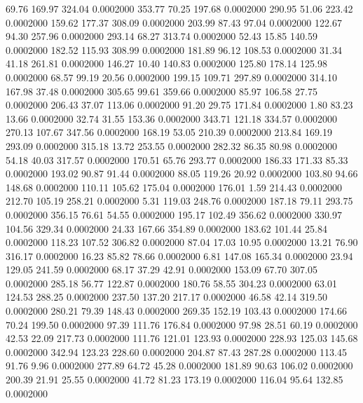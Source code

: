  69.76  169.97  324.04   0.0002000
 353.77   70.25  197.68   0.0002000
 290.95   51.06  223.42   0.0002000
 159.62  177.37  308.09   0.0002000
 203.99   87.43   97.04   0.0002000
 122.67   94.30  257.96   0.0002000
 293.14   68.27  313.74   0.0002000
  52.43   15.85  140.59   0.0002000
 182.52  115.93  308.99   0.0002000
 181.89   96.12  108.53   0.0002000
  31.34   41.18  261.81   0.0002000
 146.27   10.40  140.83   0.0002000
 125.80  178.14  125.98   0.0002000
  68.57   99.19   20.56   0.0002000
 199.15  109.71  297.89   0.0002000
 314.10  167.98   37.48   0.0002000
 305.65   99.61  359.66   0.0002000
  85.97  106.58   27.75   0.0002000
 206.43   37.07  113.06   0.0002000
  91.20   29.75  171.84   0.0002000
   1.80   83.23   13.66   0.0002000
  32.74   31.55  153.36   0.0002000
 343.71  121.18  334.57   0.0002000
 270.13  107.67  347.56   0.0002000
 168.19   53.05  210.39   0.0002000
 213.84  169.19  293.09   0.0002000
 315.18   13.72  253.55   0.0002000
 282.32   86.35   80.98   0.0002000
  54.18   40.03  317.57   0.0002000
 170.51   65.76  293.77   0.0002000
 186.33  171.33   85.33   0.0002000
 193.02   90.87   91.44   0.0002000
  88.05  119.26   20.92   0.0002000
 103.80   94.66  148.68   0.0002000
 110.11  105.62  175.04   0.0002000
 176.01    1.59  214.43   0.0002000
 212.70  105.19  258.21   0.0002000
   5.31  119.03  248.76   0.0002000
 187.18   79.11  293.75   0.0002000
 356.15   76.61   54.55   0.0002000
 195.17  102.49  356.62   0.0002000
 330.97  104.56  329.34   0.0002000
  24.33  167.66  354.89   0.0002000
 183.62  101.44   25.84   0.0002000
 118.23  107.52  306.82   0.0002000
  87.04   17.03   10.95   0.0002000
  13.21   76.90  316.17   0.0002000
  16.23   85.82   78.66   0.0002000
   6.81  147.08  165.34   0.0002000
  23.94  129.05  241.59   0.0002000
  68.17   37.29   42.91   0.0002000
 153.09   67.70  307.05   0.0002000
 285.18   56.77  122.87   0.0002000
 180.76   58.55  304.23   0.0002000
  63.01  124.53  288.25   0.0002000
 237.50  137.20  217.17   0.0002000
  46.58   42.14  319.50   0.0002000
 280.21   79.39  148.43   0.0002000
 269.35  152.19  103.43   0.0002000
 174.66   70.24  199.50   0.0002000
  97.39  111.76  176.84   0.0002000
  97.98   28.51   60.19   0.0002000
  42.53   22.09  217.73   0.0002000
 111.76  121.01  123.93   0.0002000
 228.93  125.03  145.68   0.0002000
 342.94  123.23  228.60   0.0002000
 204.87   87.43  287.28   0.0002000
 113.45   91.76    9.96   0.0002000
 277.89   64.72   45.28   0.0002000
 181.89   90.63  106.02   0.0002000
 200.39   21.91   25.55   0.0002000
  41.72   81.23  173.19   0.0002000
 116.04   95.64  132.85   0.0002000
